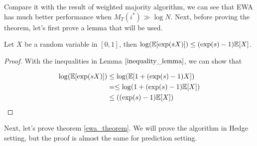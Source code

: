 \documentclass[../main.tex]{subfiles}
\begin{document}
Compare it with the result of weighted majority algorithm, we can see that EWA has much better performance when $M_T(i^*) \gg \log N$. Next, before proving the theorem, let's first prove a lemma that will be used.

\begin{lemma}
	Let $X$ be a random variable in $[0,1]$, then $\log(\mathbb{E}[\exp(sX)]) \leq (\exp(s) - 1) \mathbb{E}[X]$.
\end{lemma}
	\begin{proof}
		
		With the inequalities in Lemma $\ref{inequality_lemma}$, we can show that 
		
		\begin{equation*}
		\begin{aligned}
		\log (\mathbb{E}[\exp(sX)]) & \leq \log (\mathbb{E}[1 + (\exp(s) - 1)X]) \\
		& = \leq \log (1 + (\exp(s) - 1)\mathbb{E}[X])\\
		& \leq ((\exp(s) - 1) \mathbb{E}[X])
		\end{aligned}
		\end{equation*}
	\end{proof}

Next, let's prove theorem \ref{ewa_theorem}. We will prove the algorithm in Hedge setting, but the proof is almost the same for prediction setting. 
\end{document}
